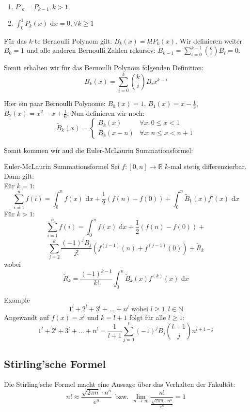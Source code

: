 \documentclass[a4paper,8pt]{extarticle}
\def\limn{\lim_{n\to \infty}}
\def\R{\mathbb{R}}
\def\N{\mathbb{N}}
\def\dx{\text{ d}x}
\begin{document}
\begin{enumerate}
  \item $P'_k = P_{k-1}, k > 1$
  \item $\int_0^1 P_k(x)\dx = 0, \forall k \geq 1$
\end{enumerate}

Für das $k$-te Bernoulli Polynom gilt: $B_k(x) = k!P_k(x)$. Wir definieren weiter $B_0=1$ und alle anderen Bernoulli Zahlen rekursiv: $B_{k-1} = \sum_{i=0}^{k-1}{k \choose i}B_i = 0$.

Somit erhalten wir für das Bernoulli Polynom folgenden Definition: $$B_k(x) = \sum_{i=0}^{k}{k \choose i}B_ix^{k-i}$$

Hier ein paar Bernoulli Polynome: $B_0(x) = 1$, $B_1(x) = x - \frac{1}{2}$, $B_2(x) = x^2 - x + \frac{1}{6}$. Nun definieren wir noch: $$\tilde{B}_k(x) = \begin{cases}
  B_k(x) & \forall x: 0 \leq x < 1 \\
  B_k(x-n) & \forall x: n \leq x < n + 1
\end{cases}$$

Somit kommen wir aud die Euler-McLaurin Summationsformel:
\begin{mainbox}{Euler-McLaurin Summationsformel}
  Sei $f: [0, n] \to \R$ $k$-mal stetig differenzierbar. Dann gilt: \\
  Für $k = 1$:
  $$\sum_{i = 1}^n f(i) = \int_0^n f(x) \dx + \frac{1}{2}(f(n) - f(0)) + \int_0^n \tilde{B}_1(x)f'(x)\dx$$
  Für $k>1$:
  $$\sum_{i = 1}^n f(i) = \int_0^n f(x) \dx + \frac{1}{2}(f(n) - f(0))+$$
  $$\sum_{j = 2}^k \frac{(-1)^j B_j}{j!}(f^{(j-1)}(n) + f^{(j-1)}(0)) + \tilde{R}_k$$
  wobei
  $$ \tilde{R}_k = \frac{(-1)^{k-1}}{k!} \int_0^n \tilde{B}_k(x)f^{(k)}(x)\dx$$
\end{mainbox}

\begin{subbox}{Example}
  $$1^l + 2^l + 3^l + ... + n^l \text{ wobei } l \geq 1, l \in \N$$
  Angewandt auf $f(x) = x^l$ und $k = l + 1$ folgt für alle $l \geq 1$:
  $$1^l + 2^l + 3^l + ... + n^l = \frac{1}{l + 1} \sum_{j = 0}^l (-1)^j B_j {l + 1 \choose j} n^{l+1-j}$$
\end{subbox}
\subsection{Stirling'sche Formel}
Die Stirling'sche Formel macht eine Aussage über das Verhalten der Fakultät:
$$n! \approx \frac{\sqrt{2 \pi n}\cdot n^n}{e^n} \ \ \text{bzw.} \ \ \limn \frac{n!}{\frac{\sqrt{2 \pi n}\cdot n^n}{e^n}} = 1$$
\end{document}

